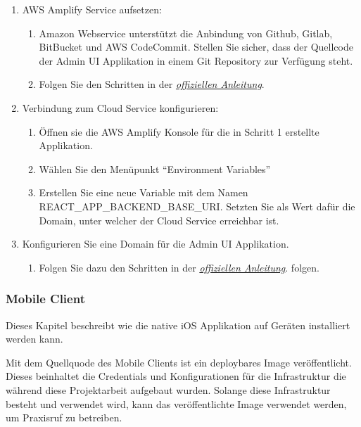 \begin{enumerate}
    \item AWS Amplify Service aufsetzen:
    \begin{enumerate}
        \item Amazon Webservice unterstützt die Anbindung von Github, Gitlab, BitBucket und AWS CodeCommit. Stellen Sie sicher, dass der Quellcode der Admin UI Applikation in einem Git Repository zur Verfügung steht.
        \item Folgen Sie den Schritten in der \href{https://docs.aws.amazon.com/amplify/latest/userguide/getting-started.html}{\textit{offiziellen Anleitung}}.\cite{aws-amplify}
    \end{enumerate}
    \item Verbindung zum Cloud Service konfigurieren:
    \begin{enumerate}
        \item Öffnen sie die AWS Amplify Konsole für die in Schritt 1 erstellte Applikation.
        \item Wählen Sie den Menüpunkt ``Environment Variables''
        \item Erstellen Sie eine neue Variable mit dem Namen REACT\_APP\_BACKEND\_BASE\_URI. Setzten Sie als Wert dafür die Domain, unter welcher der Cloud Service erreichbar ist.
    \end{enumerate}
    \item Konfigurieren Sie eine Domain für die Admin UI Applikation.
    \begin{enumerate}
        \item Folgen Sie dazu den Schritten in der \href{https://docs.aws.amazon.com/amplify/latest/userguide/custom-domains.html}{\textit{offiziellen Anleitung}}.\cite{aws-amplify-domain} folgen.
    \end{enumerate}
\end{enumerate}

\clearpage

\subsubsection*{Mobile Client}

Dieses Kapitel beschreibt wie die native iOS Applikation auf Geräten installiert werden kann.

Mit dem Quellquode des Mobile Clients ist ein deploybares Image veröffentlicht.
Dieses beinhaltet die Credentials und Konfigurationen für die Infrastruktur die während diese Projektarbeit aufgebaut wurden.
Solange diese Infrastruktur besteht und verwendet wird, kann das veröffentlichte Image verwendet werden, um Praxisruf zu betreiben.

